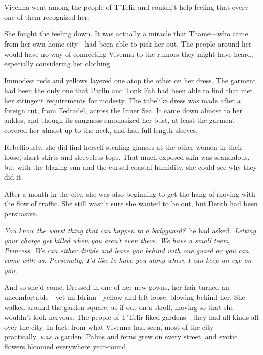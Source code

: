 \chapter{}

Vivenna went among the people of T’Telir and couldn’t help feeling that every one of them recognized her.

She fought the feeling down. It was actually a miracle that Thame—who came from her own home city—had been able to pick her out. The people around her would have no way of connecting Vivenna to the rumors they might have heard, especially considering her clothing.

Immodest reds and yellows layered one atop the other on her dress. The garment had been the only one that Parlin and Tonk Fah had been able to find that met her stringent requirements for modesty. The tubelike dress was made after a foreign cut, from Tedradel, across the Inner Sea. It came down almost to her ankles, and though its snugness emphasized her bust, at least the garment covered her almost up to the neck, and had full-length sleeves.

Rebelliously, she did find herself stealing glances at the other women in their loose, short skirts and sleeveless tops. That much exposed skin was scandalous, but with the blazing sun and the cursed coastal humidity, she could see why they did it.

After a month in the city, she was also beginning to get the hang of moving with the flow of traffic. She still wasn’t sure she wanted to be out, but Denth had been persuasive.

\textit{You know the worst thing that can happen to a bodyguard?}~he had asked.~\textit{Letting your charge get killed when you aren’t even there. We have a small team, Princess. We can either divide and leave you behind with one guard or you can come with us. Personally, I’d like to have you along where I can keep an eye on you.}

And so she’d come. Dressed in one of her new gowns, her hair turned an uncomfortable—yet un-Idrian—yellow and left loose, blowing behind her. She walked around the garden square, as if out on a stroll, moving so that she wouldn’t look nervous. The people of T’Telir liked gardens—they had all kinds all over the city. In fact, from what Vivenna had seen, most of the city practically~\textit{was}~a garden. Palms and ferns grew on every street, and exotic flowers bloomed everywhere year-round.

